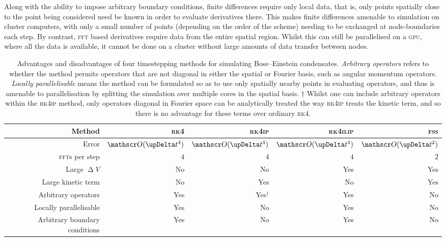 Along with the ability to impose arbitrary boundary conditions, finite differences require only local data, that is, only points spatially close to the point being considered need be known in order to evaluate derivatives there. This makes finite differences amenable to simulation on cluster computers, with only a small number of points (depending on the order of the scheme) needing to be exchanged at node-boundaries each step. By contrast, \textsc{fft} based derivatives require data from the entire spatial region. Whilst this can still be parallelised on a \textsc{gpu}, where all the data is available, it cannot be done on a cluster without large amounts of data transfer between nodes.

\begin{table}
\centering
\begin{tabular}[c]{|r||rrrr|}
\hline
Method & \textsc{rk4} & \textsc{rk4ip} & \textsc{rk4ilip} & \textsc{fss} \\
\hline
Error & $\Ord{\upDelta t^4}$ & $\Ord{\upDelta t^4}$& $\Ord{\upDelta t^4}$ & $\Ord{\upDelta t^2}$\\
\textsc{fft}s per step & $4$ & $4$ & $4$ & $2$\\
Large $\upDelta V$ & No & No & Yes & Yes\\
Large kinetic term & No & Yes & No & Yes\\
Arbitrary operators & Yes & Yes$^\dagger$ & Yes & No\\
Locally parallelisable & Yes & No & Yes & No\\
Arbitrary boundary conditions & Yes & No & Yes & No\\
\hline
\end{tabular}
\caption{Advantages and disadvantages of four timestepping methods for simulating Bose--Einstein condensates. \emph{Arbitrary operators} refers to whether the method permits operators that are not diagonal in either the spatial or Fourier basis, such as angular momentum operators. \emph{Locally parallelisable} means the method can be formulated so as to use only spatially nearby points in evaluating operators, and thus is amenable to parallelisation by splitting the simulation over multiple cores in the spatial basis.
$\dagger$ Whilst one can include arbitrary operators within the \textsc{rk4ip} method, only operators diagonal in Fourier space can be analytically treated the way \textsc{rk4ip} treats the kinetic term, and so there is no advantage for these terms over ordinary \textsc{rk4}.}\label{table:rk4ilip_methods}
\end{table}


